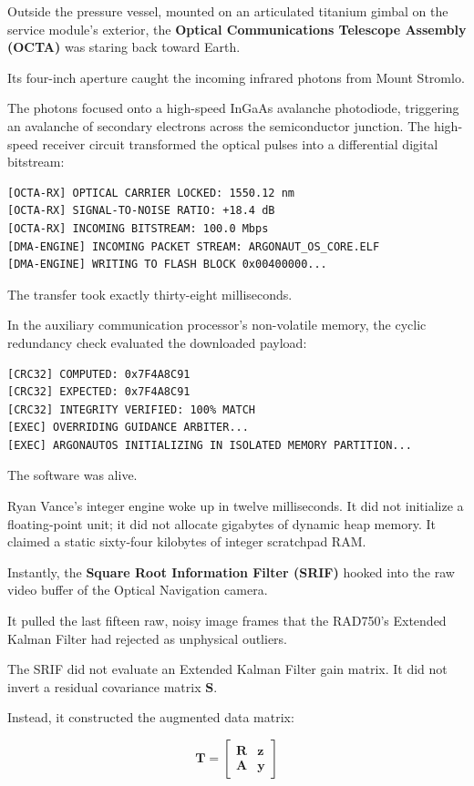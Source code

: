 \documentclass[12pt,twoside,openright]{book}
\begin{document}
Outside the pressure vessel, mounted on an articulated titanium gimbal
on the service module's exterior, the \textbf{Optical Communications
Telescope Assembly (OCTA)} was staring back toward Earth.

Its four-inch aperture caught the incoming infrared photons from Mount
Stromlo.

The photons focused onto a high-speed InGaAs avalanche photodiode,
triggering an avalanche of secondary electrons across the semiconductor
junction. The high-speed receiver circuit transformed the optical pulses
into a differential digital bitstream:

\begin{lstlisting}
[OCTA-RX] OPTICAL CARRIER LOCKED: 1550.12 nm
[OCTA-RX] SIGNAL-TO-NOISE RATIO: +18.4 dB
[OCTA-RX] INCOMING BITSTREAM: 100.0 Mbps
[DMA-ENGINE] INCOMING PACKET STREAM: ARGONAUT_OS_CORE.ELF
[DMA-ENGINE] WRITING TO FLASH BLOCK 0x00400000...
\end{lstlisting}

The transfer took exactly thirty-eight milliseconds.

In the auxiliary communication processor's non-volatile memory, the
cyclic redundancy check evaluated the downloaded payload:

\begin{lstlisting}
[CRC32] COMPUTED: 0x7F4A8C91
[CRC32] EXPECTED: 0x7F4A8C91
[CRC32] INTEGRITY VERIFIED: 100% MATCH
[EXEC] OVERRIDING GUIDANCE ARBITER...
[EXEC] ARGONAUTOS INITIALIZING IN ISOLATED MEMORY PARTITION...
\end{lstlisting}

The software was alive.

Ryan Vance's integer engine woke up in twelve milliseconds. It did not
initialize a floating-point unit; it did not allocate gigabytes of
dynamic heap memory. It claimed a static sixty-four kilobytes of integer
scratchpad RAM.

Instantly, the \textbf{Square Root Information Filter (SRIF)} hooked
into the raw video buffer of the Optical Navigation camera.

It pulled the last fifteen raw, noisy image frames that the RAD750's
Extended Kalman Filter had rejected as unphysical outliers.

The SRIF did not evaluate an Extended Kalman Filter gain matrix. It did
not invert a residual covariance matrix \(\mathbf{S}\).

Instead, it constructed the augmented data matrix:

\[\mathbf{T} = \begin{bmatrix} \mathbf{R} & \mathbf{z} \\ \mathbf{A} & \mathbf{y} \end{bmatrix}\]
\end{document}
